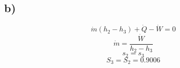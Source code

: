 

\subsection*{b)}
\begin{equation*}
    \dot{m} (h_2 - h_3) + \dot{Q} - \dot{W} = 0
\end{equation*}
\begin{equation*}
    \dot{m} = \frac{\dot{W}}{h_2 - h_3}
\end{equation*}
\begin{equation*}
    s_2 = s_3
\end{equation*}
\begin{equation*}
    S_3 = S_2 = 0.9006
\end{equation*}